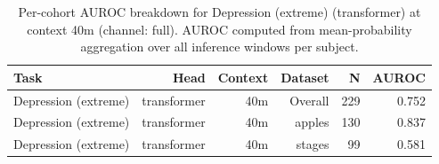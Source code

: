 \begin{table}[ht]
\centering
\caption{Per-cohort AUROC breakdown for Depression (extreme) (transformer) at context 40m (channel: full). AUROC computed from mean-probability aggregation over all inference windows per subject.}
\label{tab:cohort_depression_extreme_binary_transformer_full}
\begin{tabular}{lrrrrr}
\toprule
Task & Head & Context & Dataset & N & AUROC \\
\midrule
Depression (extreme) & transformer & 40m & Overall & 229 & 0.752 \\
Depression (extreme) & transformer & 40m & apples & 130 & 0.837 \\
Depression (extreme) & transformer & 40m & stages & 99 & 0.581 \\
\bottomrule
\end{tabular}
\end{table}